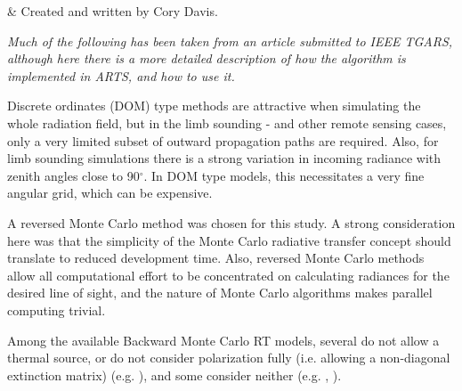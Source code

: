 %
%
 \label{sec:montecarlo}


%
%
 & Created and written by Cory Davis.\\
\stophistory


%
%
%

%
%




 \label{sec:montecarlo:intro}

\emph{Much of the following has been taken from an article submitted to IEEE
TGARS, although here there is a more detailed description of how the
algorithm is implemented in ARTS, and how to use it.} 

Discrete ordinates (DOM) type methods are attractive
when simulating the whole radiation field, but in the limb sounding -
and other remote sensing cases, only a very limited subset of outward
propagation paths are required. Also, for limb sounding simulations
there is a strong variation in incoming radiance with zenith angles
close to 90$^\circ$.
In DOM type models, this necessitates a very fine angular grid, which can be expensive.

A reversed Monte Carlo method was chosen for this study.  A strong
consideration here was that the simplicity of the Monte
Carlo radiative transfer concept should translate to reduced
development time.  Also, reversed Monte Carlo methods allow
all computational effort to be concentrated on calculating radiances
for the desired line of sight, and the nature of Monte Carlo
algorithms makes parallel computing trivial.     

Among the available Backward Monte Carlo RT models, several do not
allow a thermal source, or do not consider polarization fully (i.e.
allowing a non-diagonal extinction matrix) (e.g. \cite{liu96}), and
some consider neither (e.g. \cite{oikarenenetal}, \cite{ishimoto}).

